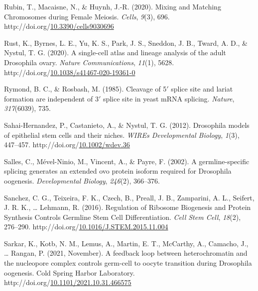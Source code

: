 \documentclass[12pt,oneside]{reedthesis}
\newlength{\cslhangindent}
\newenvironment{CSLReferences}[2] %
 {%
  \setlength{\parindent}{0pt}
  \ifodd #1 \everypar{\setlength{\hangindent}{\cslhangindent}}\ignorespaces\fi
  \ifnum #2 > 0
  \setlength{\parskip}{#2\baselineskip}
  \fi
 }%
 {}
\begin{document}
\begin{CSLReferences}{1}{0}
\leavevmode{}%
Rubin, T., Macaisne, N., \& Huynh, J.-R. (2020). Mixing and {Matching Chromosomes} during {Female Meiosis}. \emph{Cells}, \emph{9}(3), 696. http://doi.org/\href{https://doi.org/10.3390/cells9030696}{10.3390/cells9030696}

\leavevmode{}%
Rust, K., Byrnes, L. E., Yu, K. S., Park, J. S., Sneddon, J. B., Tward, A. D., \& Nystul, T. G. (2020). A single-cell atlas and lineage analysis of the adult {Drosophila} ovary. \emph{Nature Communications}, \emph{11}(1), 5628. http://doi.org/\href{https://doi.org/10.1038/s41467-020-19361-0}{10.1038/s41467-020-19361-0}

\leavevmode{}%
Rymond, B. C., \& Rosbash, M. (1985). Cleavage of 5{\({'}\)} splice site and lariat formation are independent of 3{\({'}\)} splice site in yeast {mRNA} splicing. \emph{Nature}, \emph{317}(6039), 735.

\leavevmode{}%
Sahai-Hernandez, P., Castanieto, A., \& Nystul, T. G. (2012). Drosophila models of epithelial stem cells and their niches. \emph{WIREs Developmental Biology}, \emph{1}(3), 447--457. http://doi.org/\href{https://doi.org/10.1002/wdev.36}{10.1002/wdev.36}

\leavevmode{}%
Salles, C., Mével-Ninio, M., Vincent, A., \& Payre, F. (2002). A germline-specific splicing generates an extended ovo protein isoform required for {Drosophila} oogenesis. \emph{Developmental Biology}, \emph{246}(2), 366--376.

\leavevmode{}%
Sanchez, C. G., Teixeira, F. K., Czech, B., Preall, J. B., Zamparini, A. L., Seifert, J. R. K., \ldots{} Lehmann, R. (2016). Regulation of {Ribosome Biogenesis} and {Protein Synthesis Controls Germline Stem Cell Differentiation}. \emph{Cell Stem Cell}, \emph{18}(2), 276--290. http://doi.org/\href{https://doi.org/10.1016/J.STEM.2015.11.004}{10.1016/J.STEM.2015.11.004}

\leavevmode{}%
Sarkar, K., Kotb, N. M., Lemus, A., Martin, E. T., McCarthy, A., Camacho, J., \ldots{} Rangan, P. (2021, November). A feedback loop between heterochromatin and the nucleopore complex controls germ-cell to oocyte transition during {Drosophila} oogenesis. {Cold Spring Harbor Laboratory}. http://doi.org/\href{https://doi.org/10.1101/2021.10.31.466575}{10.1101/2021.10.31.466575}


\end{CSLReferences}
\end{document}

